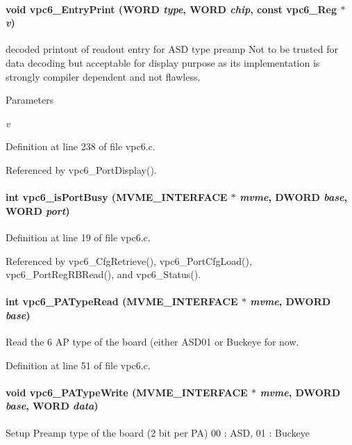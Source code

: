 \paragraph[{vpc6\_\-EntryPrint}]{\setlength{\rightskip}{0pt plus 5cm}void vpc6\_\-EntryPrint ({\bf WORD} {\em type}, \/  {\bf WORD} {\em chip}, \/  const {\bf vpc6\_\-Reg} $\ast$ {\em v})}\hfill\label{vpc6_8h_acba11652b38f9148081dc825bb79ccd5}
decoded printout of readout entry for ASD type preamp Not to be trusted for data decoding but acceptable for display purpose as its implementation is strongly compiler dependent and not flawless. 
\begin{DoxyParams}{Parameters}
\item[{\em v}]\end{DoxyParams}


Definition at line 238 of file vpc6.c.

Referenced by vpc6\_\-PortDisplay().
\paragraph[{vpc6\_\-isPortBusy}]{\setlength{\rightskip}{0pt plus 5cm}int vpc6\_\-isPortBusy ({\bf MVME\_\-INTERFACE} $\ast$ {\em mvme}, \/  {\bf DWORD} {\em base}, \/  {\bf WORD} {\em port})}\hfill\label{vpc6_8h_a3b49ac5c590e4a1da458708bd791ec76}


Definition at line 19 of file vpc6.c.

Referenced by vpc6\_\-CfgRetrieve(), vpc6\_\-PortCfgLoad(), vpc6\_\-PortRegRBRead(), and vpc6\_\-Status().
\paragraph[{vpc6\_\-PATypeRead}]{\setlength{\rightskip}{0pt plus 5cm}int vpc6\_\-PATypeRead ({\bf MVME\_\-INTERFACE} $\ast$ {\em mvme}, \/  {\bf DWORD} {\em base})}\hfill\label{vpc6_8h_afb94d63b60eab3d570396b532e3fdeec}
Read the 6 AP type of the board (either ASD01 or Buckeye for now. 

Definition at line 51 of file vpc6.c.
\paragraph[{vpc6\_\-PATypeWrite}]{\setlength{\rightskip}{0pt plus 5cm}void vpc6\_\-PATypeWrite ({\bf MVME\_\-INTERFACE} $\ast$ {\em mvme}, \/  {\bf DWORD} {\em base}, \/  {\bf WORD} {\em data})}\hfill\label{vpc6_8h_aeebefabbb82c5db323d9d80f554586ce}
Setup Preamp type of the board (2 bit per PA) 00 : ASD, 01 : Buckeye 

